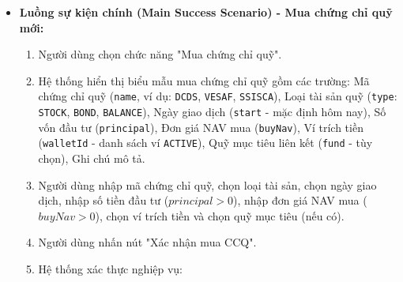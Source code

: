 \documentclass[11pt,a4paper]{article}
\providecommand{\tightlist}{
  \setlength{\itemsep}{0pt}\setlength{\parskip}{0pt}}
\begin{document}
\begin{itemize}
  \begin{enumerate}
  \def\labelenumi{\arabic{enumi}.}
  \tightlist
  \item
    Khi mua CCQ: Bản ghi đầu tư mới được lưu vào bảng
    \texttt{fund\_certs} với trạng thái \texttt{HOLDING}, số lượng đơn
    vị quỹ \(Units = Principal / NAV_{buy}\) được tính toán với độ chính
    xác tối thiểu 4 chữ số thập phân, số dư ví trích tiền giảm đúng bằng
    số vốn đầu tư theo \texttt{BR-FIN-02}.
  \item
    Khi cập nhật NAV: Giá trị thị trường hiện tại của toàn bộ các lô quỹ
    cùng mã được tính lại tức thời:
    \(Balance = Units \times NAV_{latest}\), lịch sử biến động NAV được
    lưu vào bảng \texttt{fund\_performance}.
  \item
    Khi tra cứu: Lãi lỗ chưa thực hiện (\(UnrealizedPL\)), tỷ suất lợi
    nhuận tuyệt đối và suất sinh lời quy đổi năm (\(AnnualizedRate\) nếu
    \(HoldDays \ge 30\)) được tính toán chính xác theo
    \texttt{BR-FIN-06}.
  \item
    Khi bán CCQ: Số tiền thu về \(Proceeds = sellUnits \times sellNav\)
    được cộng vào ví nhận tiền; số lượng CCQ nắm giữ và vốn gốc được
    khấu trừ theo phương pháp tỷ trọng bình quân; lợi nhuận thực tế
    (\(RealizedPL\)) được ghi nhận vào sổ kết quả tài chính; nếu bán hết
    thì chuyển trạng thái sang \texttt{CLOSED}.
  \end{enumerate}
\item
  \textbf{Luồng sự kiện chính (Main Success Scenario) - Mua chứng chỉ
  quỹ mới:}

  \begin{enumerate}
  \def\labelenumi{\arabic{enumi}.}
  \tightlist
  \item
    Người dùng chọn chức năng "Mua chứng chỉ quỹ".
  \item
    Hệ thống hiển thị biểu mẫu mua chứng chỉ quỹ gồm các trường: Mã
    chứng chỉ quỹ (\texttt{name}, ví dụ: \texttt{DCDS}, \texttt{VESAF},
    \texttt{SSISCA}), Loại tài sản quỹ (\texttt{type}: \texttt{STOCK},
    \texttt{BOND}, \texttt{BALANCE}), Ngày giao dịch (\texttt{start} -
    mặc định hôm nay), Số vốn đầu tư (\texttt{principal}), Đơn giá NAV
    mua (\texttt{buyNav}), Ví trích tiền (\texttt{walletId} - danh sách
    ví \texttt{ACTIVE}), Quỹ mục tiêu liên kết (\texttt{fund} - tùy
    chọn), Ghi chú mô tả.
  \item
    Người dùng nhập mã chứng chỉ quỹ, chọn loại tài sản, chọn ngày giao
    dịch, nhập số tiền đầu tư (\(principal > 0\)), nhập đơn giá NAV mua
    (\(buyNav > 0\)), chọn ví trích tiền và chọn quỹ mục tiêu (nếu có).
  \item
    Người dùng nhấn nút "Xác nhận mua CCQ".
  \item
    Hệ thống xác thực nghiệp vụ:


\end{enumerate}
\end{itemize}
\end{document}
